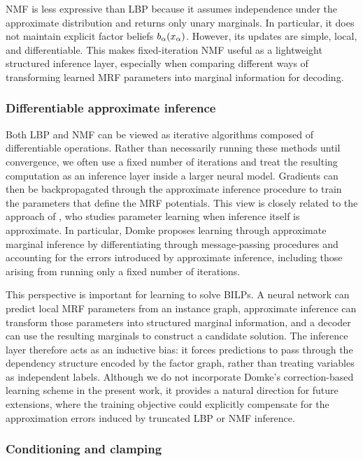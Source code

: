 NMF is less expressive than LBP because it assumes independence under the approximate distribution and returns only unary marginals. In particular, it does not maintain explicit factor beliefs $b_{\alpha}(x_{\alpha})$. However, its updates are simple, local, and differentiable. This makes fixed-iteration NMF useful as a lightweight structured inference layer, especially when comparing different ways of transforming learned MRF parameters into marginal information for decoding.


\subsubsection{Differentiable approximate inference}

Both LBP and NMF can be viewed as iterative algorithms composed of differentiable operations. Rather than necessarily running these methods until convergence, we often use a fixed number of iterations and treat the resulting computation as an inference layer inside a larger neural model. Gradients can then be backpropagated through the approximate inference procedure to train the parameters that define the MRF potentials. This view is closely related to the approach of \citet{domke_learning_2013}, who studies parameter learning when inference itself is approximate. In particular, Domke proposes learning through approximate marginal inference by differentiating through message-passing procedures and accounting for the errors introduced by approximate inference, including those arising from running only a fixed number of iterations.

This perspective is important for learning to solve BILPs. A neural network can predict local MRF parameters from an instance graph, approximate inference can transform those parameters into structured marginal information, and a decoder can use the resulting marginals to construct a candidate solution. The inference layer therefore acts as an inductive bias: it forces predictions to pass through the dependency structure encoded by the factor graph, rather than treating variables as independent labels. Although we do not incorporate Domke's correction-based learning scheme in the present work, it provides a natural direction for future extensions, where the training objective could explicitly compensate for the approximation errors induced by truncated LBP or NMF inference.

\subsubsection{Conditioning and clamping}
\label{subsec:background_conditional_clamping}

